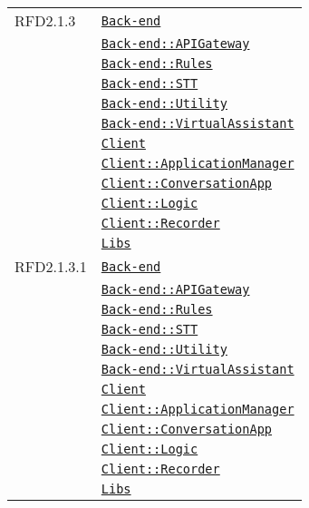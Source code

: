 \begin{longtable}{|>{\centering}m{3cm}|m{10cm}<{\centering}|}
RFD2.1.3 & \hyperref[Back-end]{\texttt{Back-end}}\\
& \hyperref[Back-end::APIGateway]{\texttt{Back-end::APIGateway}}\\
& \hyperref[Back-end::Rules]{\texttt{Back-end::Rules}}\\
& \hyperref[Back-end::STT]{\texttt{Back-end::STT}}\\
& \hyperref[Back-end::Utility]{\texttt{Back-end::Utility}}\\
& \hyperref[Back-end::VirtualAssistant]{\texttt{Back-end::VirtualAssistant}}\\
& \hyperref[Client]{\texttt{Client}}\\
& \hyperref[Client::ApplicationManager]{\texttt{Client::ApplicationManager}}\\
& \hyperref[Client::ConversationApp]{\texttt{Client::ConversationApp}}\\
& \hyperref[Client::Logic]{\texttt{Client::Logic}}\\
& \hyperref[Client::Recorder]{\texttt{Client::Recorder}}\\
& \hyperref[Libs]{\texttt{Libs}}\\ \hline

RFD2.1.3.1 & \hyperref[Back-end]{\texttt{Back-end}}\\
& \hyperref[Back-end::APIGateway]{\texttt{Back-end::APIGateway}}\\
& \hyperref[Back-end::Rules]{\texttt{Back-end::Rules}}\\
& \hyperref[Back-end::STT]{\texttt{Back-end::STT}}\\
& \hyperref[Back-end::Utility]{\texttt{Back-end::Utility}}\\
& \hyperref[Back-end::VirtualAssistant]{\texttt{Back-end::VirtualAssistant}}\\
& \hyperref[Client]{\texttt{Client}}\\
& \hyperref[Client::ApplicationManager]{\texttt{Client::ApplicationManager}}\\
& \hyperref[Client::ConversationApp]{\texttt{Client::ConversationApp}}\\
& \hyperref[Client::Logic]{\texttt{Client::Logic}}\\
& \hyperref[Client::Recorder]{\texttt{Client::Recorder}}\\
& \hyperref[Libs]{\texttt{Libs}}\\ \hline


\end{longtable}
